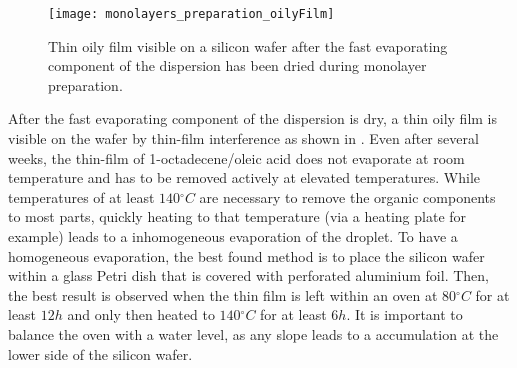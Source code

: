\documentclass[\main/dresen_thesis.tex]{subfiles}
\begin{document}
  \begin{figure}[tb]
    \centering
    \texttt{[image: monolayers\_preparation\_oilyFilm]}
    \caption{\label{fig:monolayers:preparation:dryingConditions:oilyFilm}Thin oily film visible on a silicon wafer after the fast evaporating component of the dispersion has been dried during monolayer preparation.}
  \end{figure}
  After the fast evaporating component of the dispersion is dry, a thin oily film is visible on the wafer by thin-film interference as shown in .
  Even after several weeks, the thin-film of 1-octadecene/oleic acid does not evaporate at room temperature and has to be removed actively at elevated temperatures.
  While temperatures of at least $140 \unit{^\circ C}$ are necessary to remove the organic components to most parts, quickly heating to that temperature (via a heating plate for example) leads to a inhomogeneous evaporation of the droplet.
  To have a homogeneous evaporation, the best found method is to place the silicon wafer within a glass Petri dish that is covered with perforated aluminium foil.
  Then, the best result is observed when the thin film is left within an oven at $80 \unit{^\circ C}$ for at least $12\unit{h}$ and only then heated to $140 \unit{^\circ C}$ for at least $6\unit{h}$.
  It is important to balance the oven with a water level, as any slope leads to a accumulation at the lower side of the silicon wafer.
\end{document}
